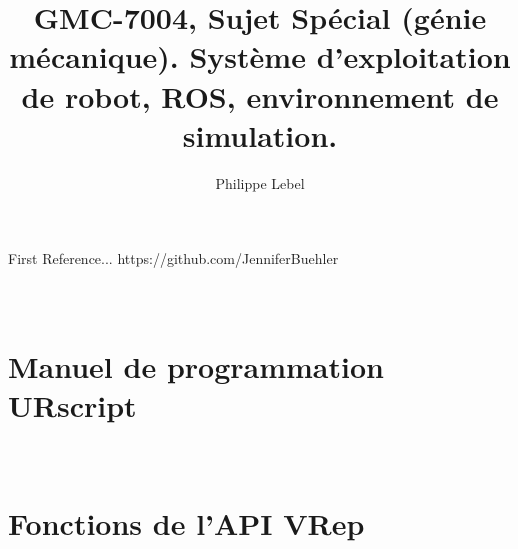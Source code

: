 \documentclass{articleUL}
\title{GMC-7004, Sujet Spécial (génie mécanique). Système d'exploitation de robot, ROS, environnement de simulation.}
\author{Philippe Lebel
 \affiliation{Université Laval, philippe.lebel.4@ulaval.ca}}
\begin{document}
 \maketitle
 
 
 
 
 
 
 \begin{thebibliography}{}
  First Reference...
  https://github.com/JenniferBuehler
 \end{thebibliography}
 \newpage
 \appendix
\section{\\Manuel de programmation URscript} \label{app:URscript_manual}



\section{\\Fonctions de l'API VRep} \label{app:VRep_manual}


 
\end{document}
